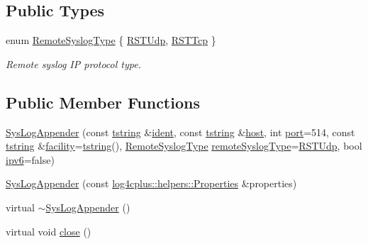 \subsection*{Public Types}
\begin{DoxyCompactItemize}
\item 
enum \hyperlink{classlog4cplus_1_1SysLogAppender_a1c7b4852672b2e8fe3c00c215c34d407}{Remote\-Syslog\-Type} \{ \hyperlink{classlog4cplus_1_1SysLogAppender_a1c7b4852672b2e8fe3c00c215c34d407af39026300d252ee2c04f477d57b12dd9}{R\-S\-T\-Udp}, 
\hyperlink{classlog4cplus_1_1SysLogAppender_a1c7b4852672b2e8fe3c00c215c34d407a157d91b3393dd2ccf833b2d471708767}{R\-S\-T\-Tcp}
 \}
\begin{DoxyCompactList}\small\item\em Remote syslog I\-P protocol type. \end{DoxyCompactList}\end{DoxyCompactItemize}
\subsection*{Public Member Functions}
\begin{DoxyCompactItemize}
\item 
\hyperlink{classlog4cplus_1_1SysLogAppender_a7c03f220525f884bd9ad794741b0dde6}{Sys\-Log\-Appender} (const \hyperlink{namespacelog4cplus_a3c9287f6ebcddc50355e29d71152117b}{tstring} \&\hyperlink{classlog4cplus_1_1SysLogAppender_a1c134d3951669090128e20342e88acba}{ident}, const \hyperlink{namespacelog4cplus_a3c9287f6ebcddc50355e29d71152117b}{tstring} \&\hyperlink{classlog4cplus_1_1SysLogAppender_aac29818cf18aaaaf24158c728500399d}{host}, int \hyperlink{classlog4cplus_1_1SysLogAppender_a4ead2abb8439ca8a1c68028d2006eb5d}{port}=514, const \hyperlink{namespacelog4cplus_a3c9287f6ebcddc50355e29d71152117b}{tstring} \&\hyperlink{classlog4cplus_1_1SysLogAppender_a2fcd41cf54cfd3c3026a2ed684df3db3}{facility}=\hyperlink{namespacelog4cplus_a3c9287f6ebcddc50355e29d71152117b}{tstring}(), \hyperlink{classlog4cplus_1_1SysLogAppender_a1c7b4852672b2e8fe3c00c215c34d407}{Remote\-Syslog\-Type} \hyperlink{classlog4cplus_1_1SysLogAppender_ace612a729b15603c3d8463ab566a2a2d}{remote\-Syslog\-Type}=\hyperlink{classlog4cplus_1_1SysLogAppender_a1c7b4852672b2e8fe3c00c215c34d407af39026300d252ee2c04f477d57b12dd9}{R\-S\-T\-Udp}, bool \hyperlink{classlog4cplus_1_1SysLogAppender_aceb0543b47c4ccbd09511fd87b24abaf}{ipv6}=false)
\item 
\hyperlink{classlog4cplus_1_1SysLogAppender_a10e304ac00f0dc5148fca19437e8b548}{Sys\-Log\-Appender} (const \hyperlink{classlog4cplus_1_1helpers_1_1Properties}{log4cplus\-::helpers\-::\-Properties} \&properties)
\item 
virtual \hyperlink{classlog4cplus_1_1SysLogAppender_a1f736612a1e9c3fcc390535bb3d72fa9}{$\sim$\-Sys\-Log\-Appender} ()
\item 
virtual void \hyperlink{classlog4cplus_1_1SysLogAppender_aceadbe394e201c989cf023d5cd186ac0}{close} ()
\end{DoxyCompactItemize}
